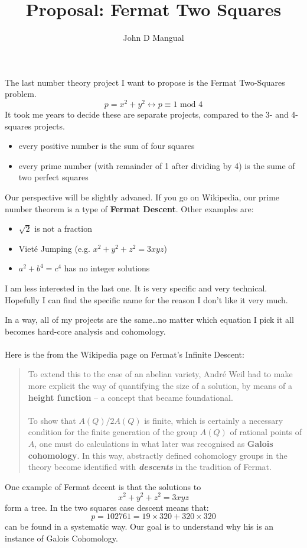 \documentclass[12pt]{article}
\title{\textbf{Proposal: Fermat Two Squares}}
\author{John D Mangual}
\date{}
\begin{document}
\selectfont \fontsize{20}{25}\selectfont

\maketitle

\noindent The last number theory project I want to propose is the Fermat Two-Squares problem.
$$ p = x^2 + y^2 \longleftrightarrow p \equiv 1 \text{ mod }4 $$
It took me years to decide these are separate projects, compared to the 3- and 4- squares projects. 
\begin{itemize}
\item every positive number is the sum of four squares
\item every prime number (with remainder of 1 after dividing by 4) is the sume of two perfect squares
\end{itemize}
Our perspective will be slightly advaned.  If you go on Wikipedia, our prime number theorem is a type of \textbf{Fermat Descent}.  Other examples are:
\begin{itemize}
\item $\sqrt{2}$ is not a fraction
\item Viet\'{e} Jumping (e.g. $x^2 + y^2 + z^2 = 3xyz$)
\item $a^2 + b^4 = c^4$ has no integer solutions
\end{itemize}
I am less interested in the last one.  It is very specific and very technical.  Hopefully I can find the specific name for the reason I don't like it very much. 

\newpage

\noindent In a way, all of my projects are the same\dots no matter which equation I pick it all becomes hard-core analysis and cohomology. \\ \\
Here is the from the Wikipedia page on Fermat's Infinite Descent:
\begin{quotation}
{\color{blue} To extend this to the case of an abelian variety, Andr\'{e} Weil had to make more explicit the way of quantifying the size of a solution, by means of a \textbf{\color{black}height function} -- a concept that became foundational. \\\\ To show that $A(Q)/2A(Q)$ is finite, which is certainly a necessary condition for the finite generation of the group $A(Q)$ of rational points of $A$, one must do calculations in what later was recognised as \textbf{\color{black}Galois cohomology}. In this way, abstractly defined cohomology groups in the theory become identified with \textit{\color{green!85!white!90!black}\textbf{descents}} in the tradition of Fermat. }
\end{quotation}
One example of Fermat decent is that the solutions to 
$$ x^2 + y^2 + z^2 = 3xyz $$
form a tree.  In the two squares case descent means that:
$$ p = 102761 = 19 \times 320 + 320 \times 320 $$
can be found in a systematic way.  Our goal is to understand why his is an instance of Galois Cohomology.
\end{document}
